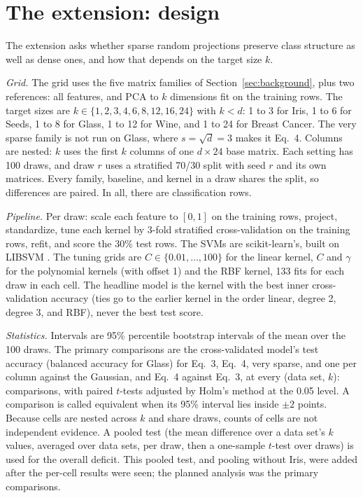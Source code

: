 \section{The extension: design}
\label{sec:design}

The extension asks whether sparse random projections preserve class structure as well as dense ones, and how that depends on the target size $k$.

\emph{Grid.} The grid uses the five matrix families of Section~\ref{sec:background}, plus two references: all features, and PCA to $k$ dimensions fit on the training rows. The target sizes are $k \in \{1, 2, 3, 4, 6, 8, 12, 16, 24\}$ with $k < d$: 1 to 3 for Iris, 1 to 6 for Seeds, 1 to 8 for Glass, 1 to 12 for Wine, and 1 to 24 for Breast Cancer. The very sparse family is not run on Glass, where $s = \sqrt{d} = 3$ makes it Eq.~4. Columns are nested: $k$ uses the first $k$ columns of one $d \times 24$ base matrix. Each setting has 100 draws, and draw $r$ uses a stratified 70/30 split with seed $r$ and its own matrices. Every family, baseline, and kernel in a draw shares the split, so differences are paired. In all, there are  classification rows.

\emph{Pipeline.} Per draw: scale each feature to $[0, 1]$ on the training rows, project, standardize, tune each kernel by 3-fold stratified cross-validation on the training rows, refit, and score the 30\% test rows. The SVMs are scikit-learn's, built on LIBSVM \cite{pedregosa2011,chang2011}. The tuning grids are $C \in \{0.01, \dots, 100\}$ for the linear kernel, $C$ and $\gamma$ for the polynomial kernels (with offset 1) and the RBF kernel, 133 fits for each draw in each cell. The headline model is the kernel with the best inner cross-validation accuracy (ties go to the earlier kernel in the order linear, degree 2, degree 3, and RBF), never the best test score.

\emph{Statistics.} Intervals are 95\% percentile bootstrap intervals \cite{efron1993} of the mean over the 100 draws. The primary comparisons are the cross-validated model's test accuracy (balanced accuracy for Glass) for Eq.~3, Eq.~4, very sparse, and one per column against the Gaussian, and Eq.~4 against Eq.~3, at every (data set, $k$):  comparisons, with paired $t$-tests adjusted by Holm's method \cite{holm1979} at the 0.05 level. A comparison is called equivalent when its 95\% interval lies inside $\pm 2$ points. Because cells are nested across $k$ and share draws, counts of cells are not independent evidence. A pooled test (the mean difference over a data set's $k$ values, averaged over data sets, per draw, then a one-sample $t$-test over draws) is used for the overall deficit. This pooled test, and pooling without Iris, were added after the per-cell results were seen; the planned analysis was the primary comparisons.
